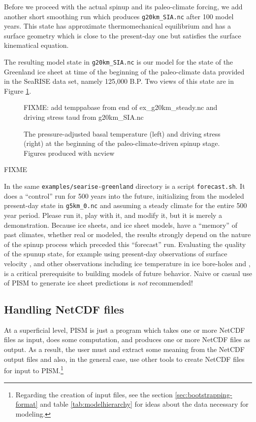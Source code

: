 Before we proceed with the actual spinup and its paleo-climate forcing, we add another short smoothing run which produces \texttt{g20km_SIA.nc} after 100 model years.  This state has approximate thermomechanical equilibrium and has a surface geometry which is close to the present-day one but satisfies the surface kinematical equation.

The resulting model state in \texttt{g20km_SIA.nc} is our model for the state of the Greenland ice sheet at time of the beginning of the paleo-climate data provided in the SeaRISE data set, namely 125,000 B.P.  Two views of this state are in Figure \ref{fig:sr-spinstart}.

\begin{figure}[ht]
\centering
FIXME: add temppabase from end of ex_g20km_steady.nc and driving stress taud from g20km_SIA.nc
\caption{The pressure-adjusted basal temperature (left) and driving stress (right) at the beginning of the paleo-climate-driven spinup stage.  Figures produced with ncview}
\label{fig:sr-spinstart}
\end{figure}



FIXME


In the same \verb|examples/searise-greenland| directory is a script \verb|forecast.sh|.  It does a ``control'' run for 500 years into the future, initializing from the modeled present-day state in \verb|g5km_0.nc| and assuming a steady climate for the entire 500 year period.  Please run it, play with it, and modify it, but it is merely a demonstration.  Because ice sheets, and ice sheet models, have a ``memory'' of past climates, whether real or modeled, the results strongly depend on the nature of the spinup process which preceded this ``forecast'' run.  Evaluating the quality of the spunup state, for example using present-day observations of surface velocity \cite{BKAJS}, and other observations including ice temperature in ice bore-holes and , is a critical prerequisite to building models of future behavior.  Naive or casual use of PISM to generate ice sheet predictions is \emph{not} recommended!


\subsection{Handling NetCDF files}\label{subsect:nctoolsintro}  At a superficial level, PISM is just a program which takes one or more NetCDF files as input, does some computation, and produces one or more NetCDF files as output.  As a result, the user must and extract some meaning from the NetCDF output files and also, in the general case, use other tools to create NetCDF files for input to PISM.\footnote{Regarding the creation of input files, see the section \ref{sec:bootstrapping-format} and table \ref{tab:modelhierarchy} for ideas about the data necessary for modeling.}

